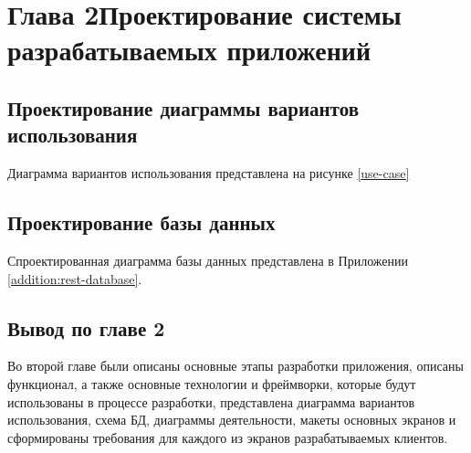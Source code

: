 \documentclass[14pt,a4paper]{scrartcl}
\begin{document}
    

    

    \clearpage
    \tableofcontents

%    
    
    

    \section[Глава 2 Проектирование системы разрабатываемых приложений]{Глава 2\break Проектирование системы разрабатываемых приложений}
    \label{sec:charpter-2-designing}

    
    
    

    \subsection{Проектирование диаграммы вариантов использования}\label{subsec:design-use-case}\indent

    Диаграмма вариантов использования представлена на рисунке \ref{use-case}

    \subsection{Проектирование базы данных}\label{subsec:design-db}\indent

    Спроектированная диаграмма базы данных представлена в Приложении \ref{addition:rest-database}.

    
    
    
    

    \subsection{Вывод по главе 2}\label{subsec:2-conclusion}\indent

    Во второй главе были описаны основные этапы разработки приложения, описаны функционал, а также основные технологии и фреймворки, которые будут использованы в процессе разработки, представлена диаграмма вариантов использования, схема БД, диаграммы деятельности, макеты основных экранов и сформированы требования для каждого из экранов разрабатываемых клиентов.
\end{document}
